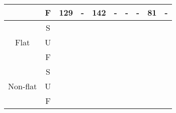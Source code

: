 \begin{table}[ht]
\begin{tabular}{|c|c|c|c|c|c|c|c|c|c|}
         & F & 129 & - & 142 & - & - & - &  {\bf 81} & -\\
         \hline
         \cline{1-10}
        \multirow{3}{*}{Flat} & S &  &  &  &  & &&   & \\
        \cline{2-10}
         & U &  &  &  &  & &&  &  \\
         \cline{2-10}
         & F &  &  &  & & &&  &  \\ \hline
         \cline{1-10}
        \multirow{3}{*}{Non-flat} & S &  &  &  &  & &&  & \\
        \cline{2-10}
         & U &  &  &  &  & && &  \\
         \cline{2-10}
         & F &  &  &  & & &&  &  \\ \hline
         \cline{1-10}
        \end{tabular}
            \label{table:arithmetic}
\end{table}